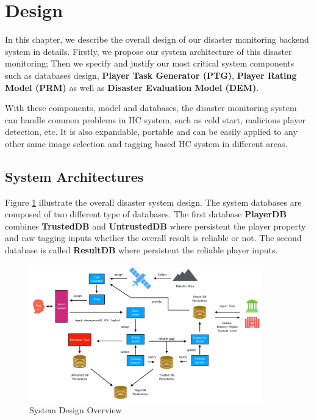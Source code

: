 \section{Design}

In this chapter, we describe the overall design of our disaster monitoring backend system in details.
Firstly, we propose our system architecture of this disaster monitoring;
Then we specify and justify our most critical system components such as databases design, 
\textbf{Player Task Generator (PTG)\label{idx:ptg}}, \textbf{Player Rating Model (PRM)\label{idx:prm}} 
as well as \textbf{Disaster Evaluation Model (DEM)\label{idx:dem}}.

With these components, model and databases, the disaster monitoring system can handle
common problems in HC system, such as cold start, malicious player detection, etc. 
It is also expandable, portable and can be easily applied to any other same image selection 
and tagging based HC system in different areas.

\subsection{System Architectures}

Figure \ref{fig:arch} illustrate the overall disaster system design.
The system databases are composed of two different type of databases. 
The first database \textbf{PlayerDB} combines \textbf{TrustedDB} and \textbf{UntrustedDB} 
where persistent the player property and raw tagging inputs whether the overall result is reliable or not.
The second database is called \textbf{ResultDB} where persistent the reliable player inputs.

\begin{figure}[htp]
\centering
\includegraphics[width=0.9\textwidth]{figures/system2}
\caption{System Design Overview}
\label{fig:arch}
\end{figure}

